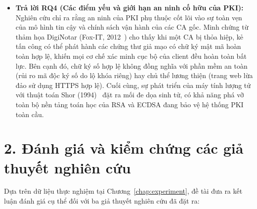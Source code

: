 \begin{itemize}
    \item \textbf{Trả lời RQ4 (Các điểm yếu và giới hạn an ninh cố hữu của PKI):} Nghiên cứu chỉ ra rằng an ninh của PKI phụ thuộc cốt lõi vào sự toàn vẹn của mô hình tin cậy và chính sách vận hành của các CA gốc. Minh chứng từ thảm họa DigiNotar (Fox-IT, 2012~\cite{prins2011diginotar}) cho thấy khi một CA bị thỏa hiệp, kẻ tấn công có thể phát hành các chứng thư giả mạo có chữ ký mật mã hoàn toàn hợp lệ, khiến mọi cơ chế xác minh cục bộ của client đều hoàn toàn bất lực. Bên cạnh đó, chữ ký số hợp lệ không đồng nghĩa với phần mềm an toàn (rủi ro mã độc ký số do lộ khóa riêng) hay chủ thể lương thiện (trang web lừa đảo sử dụng HTTPS hợp lệ). Cuối cùng, sự phát triển của máy tính lượng tử với thuật toán Shor (1994)~\cite{shor1994} đặt ra mối đe dọa sinh tử, có khả năng phá vỡ toàn bộ nền tảng toán học của RSA và ECDSA đang bảo vệ hệ thống PKI toàn cầu.
\end{itemize}

\section*{2. Đánh giá và kiểm chứng các giả thuyết nghiên cứu}

Dựa trên dữ liệu thực nghiệm tại Chương~\ref{chap:experiment}, đề tài đưa ra kết luận đánh giá cụ thể đối với ba giả thuyết nghiên cứu đã đặt ra:

